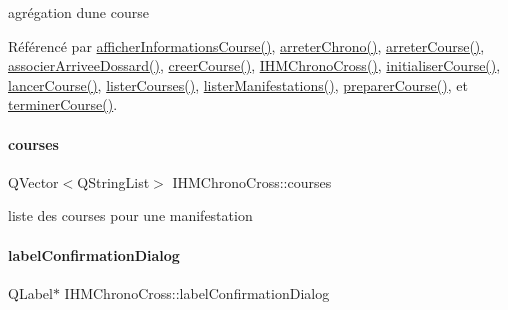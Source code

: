 agrégation d\textquotesingle{}une course 



Référencé par \hyperlink{class_i_h_m_chrono_cross_afe18e84e4df15c15921f2bdcfc6f4396}{afficher\+Informations\+Course()}, \hyperlink{class_i_h_m_chrono_cross_a8d5c89a4d2ca34252acd8737e29d37fe}{arreter\+Chrono()}, \hyperlink{class_i_h_m_chrono_cross_ad3d8f287d08dd9aa0c6b10c9973672a4}{arreter\+Course()}, \hyperlink{class_i_h_m_chrono_cross_a9f7f1ad130b60300a879694b6234f161}{associer\+Arrivee\+Dossard()}, \hyperlink{class_i_h_m_chrono_cross_a3fc01e539c59645e0655e56e440f4b83}{creer\+Course()}, \hyperlink{class_i_h_m_chrono_cross_a479fc90733fba3e65fb06aa4a3adc02e}{I\+H\+M\+Chrono\+Cross()}, \hyperlink{class_i_h_m_chrono_cross_adde019cc3799befac3fd9555e392eab9}{initialiser\+Course()}, \hyperlink{class_i_h_m_chrono_cross_ace90922ce4c4ffeed6f1e8eb84c8c7a5}{lancer\+Course()}, \hyperlink{class_i_h_m_chrono_cross_a1b9f117d7097b63ddabe168a5349a7e8}{lister\+Courses()}, \hyperlink{class_i_h_m_chrono_cross_adb47e6ee9c2a917a6df77b64930c3c48}{lister\+Manifestations()}, \hyperlink{class_i_h_m_chrono_cross_a4926e7524f4fd76ccceb0aef5ebcb203}{preparer\+Course()}, et \hyperlink{class_i_h_m_chrono_cross_ac89c6ec3040e8b787f1fbdb670405023}{terminer\+Course()}.

\mbox{\label{class_i_h_m_chrono_cross_a646f70038327c068a2f7c7be6e07d2ee}} 
\paragraph{\texorpdfstring{courses}{courses}}
{\footnotesize\ttfamily Q\+Vector$<$Q\+String\+List$>$ I\+H\+M\+Chrono\+Cross\+::courses\hspace{0.3cm}{\ttfamily [private]}}



liste des courses pour une manifestation 

\mbox{\label{class_i_h_m_chrono_cross_a20522f998469b4b34b8939dce6b239b3}} 
\paragraph{\texorpdfstring{label\+Confirmation\+Dialog}{labelConfirmationDialog}}
{\footnotesize\ttfamily Q\+Label$\ast$ I\+H\+M\+Chrono\+Cross\+::label\+Confirmation\+Dialog\hspace{0.3cm}{\ttfamily [private]}}



